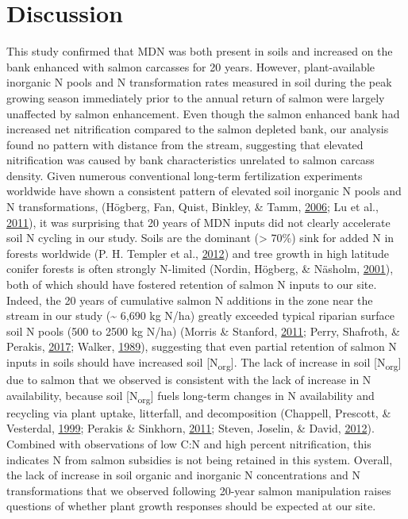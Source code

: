 \documentclass [11pt, proquest] {uwthesis}[2015/03/03]
\begin{document}
\section{Discussion}\label{discussion}

This study confirmed that MDN was both present in soils and increased on
the bank enhanced with salmon carcasses for 20 years. However,
plant-available inorganic N pools and N transformation rates measured in
soil during the peak growing season immediately prior to the annual
return of salmon were largely unaffected by salmon enhancement. Even
though the salmon enhanced bank had increased net nitrification compared
to the salmon depleted bank, our analysis found no pattern with distance
from the stream, suggesting that elevated nitrification was caused by
bank characteristics unrelated to salmon carcass density. Given numerous
conventional long-term fertilization experiments worldwide have shown a
consistent pattern of elevated soil inorganic N pools and N
transformations, (Högberg, Fan, Quist, Binkley, \& Tamm,
\protect\hyperlink{ref-Hogberg2006}{2006}; Lu et al.,
\protect\hyperlink{ref-Lu2011}{2011}), it was surprising that 20 years
of MDN inputs did not clearly accelerate soil N cycling in our study.
Soils are the dominant (\textgreater{} 70\%) sink for added N in forests
worldwide (P. H. Templer et al.,
\protect\hyperlink{ref-Templer2012}{2012}) and tree growth in high
latitude conifer forests is often strongly N-limited (Nordin, Högberg,
\& Näsholm, \protect\hyperlink{ref-Nordin2001}{2001}), both of which
should have fostered retention of salmon N inputs to our site. Indeed,
the 20 years of cumulative salmon N additions in the zone near the
stream in our study (\textasciitilde{} 6,690 kg N/ha) greatly exceeded
typical riparian surface soil N pools (500 to 2500 kg N/ha) (Morris \&
Stanford, \protect\hyperlink{ref-Morris2011}{2011}; Perry, Shafroth, \&
Perakis, \protect\hyperlink{ref-Perry2017}{2017}; Walker,
\protect\hyperlink{ref-Walker1989}{1989}), suggesting that even partial
retention of salmon N inputs in soils should have increased soil
{[}N\textsubscript{org}{]}. The lack of increase in soil
{[}N\textsubscript{org}{]} due to salmon that we observed is consistent
with the lack of increase in N availability, because soil
{[}N\textsubscript{org}{]} fuels long-term changes in N availability and
recycling via plant uptake, litterfall, and decomposition (Chappell,
Prescott, \& Vesterdal, \protect\hyperlink{ref-Chapell1999}{1999};
Perakis \& Sinkhorn, \protect\hyperlink{ref-Perakis2011}{2011}; Steven,
Joselin, \& David, \protect\hyperlink{ref-Perakis2012}{2012}). Combined
with observations of low C:N and high percent nitrification, this
indicates N from salmon subsidies is not being retained in this system.
Overall, the lack of increase in soil organic and inorganic N
concentrations and N transformations that we observed following 20-year
salmon manipulation raises questions of whether plant growth responses
should be expected at our site.
\end{document}
